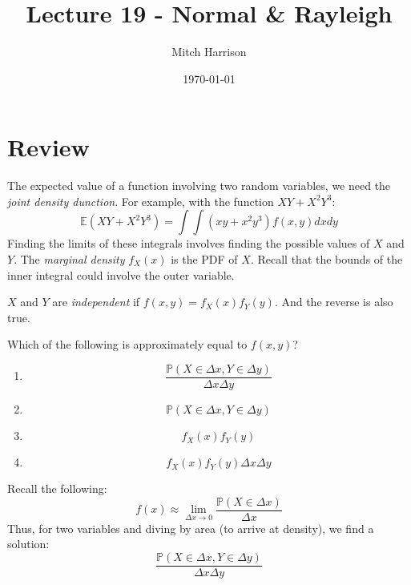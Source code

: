 \documentclass[titlepage, 12pt, leqno]{article}
\title{\Huge{Lecture 19 - Normal \& Rayleigh}}
\author{\large{Mitch Harrison}}
\date{\today}
\begin{document}
\setlength{\parskip}{1\baselineskip}
\setlength{\parindent}{15pt}
\maketitle
\tableofcontents
\newpage


\section{Review}

The expected value of a function involving two random variables, we need the
\textit{joint density dunction}. For example, with the function $XY + X^2Y^3$:
\[
    \mathbb{E}(XY+X^2Y^3) = \int \int (xy+x^2y^3)f(x,y)dxdy
\]
Finding the limits of these integrals involves finding the possible values of
$X$ and $Y$. The \textit{marginal density} $f_X(x)$ is the PDF of $X$. Recall that
the bounds of the inner integral could involve the outer variable.

$X$ and $Y$ are \textit{independent} if $f(x,y) = f_X(x)f_Y(y)$. And the reverse
is also true.

\begin{ex}
    Which of the following is approximately equal to $f(x,y)$?
    \begin{enumerate}
        \item 
            \[
            \frac{\mathbb{P}(X \in \Delta x, Y \in \Delta y)}{\Delta x \Delta y}
            \]
        \item  
            \[
            \mathbb{P}(X \in \Delta x, Y \in \Delta y)
            \]
        \item 
            \[
            f_X(x)f_Y(y)
            \]
        \item 
            \[
            f_X(x)f_Y(y)\Delta x \Delta y
            \]
    \end{enumerate}
    \vspace{10px}
    
    Recall the following:
    \[
    f(x) \approx \lim_{\Delta x \to 0} \frac{\mathbb{P}(X\in\Delta x)}{\Delta x}
    \]
    Thus, for two variables and diving by area (to arrive at density), we find a
    solution:
    \[
    \boxed{\frac{\mathbb{P}(X \in \Delta x, Y \in \Delta y)}{\Delta x \Delta y}}
    \]
    
\end{ex}
\pagebreak
\end{document}
